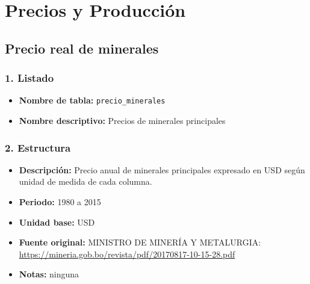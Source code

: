 \documentclass[12pt,a4paper]{article}
\begin{document}
\section{Precios y Producción}

\subsection{Precio real de minerales}

\subsubsection*{1. Listado}
\begin{itemize}
  \item \textbf{Nombre de tabla:} \texttt{precio\_minerales}
  \item \textbf{Nombre descriptivo:} Precios de minerales principales
\end{itemize}

\subsubsection*{2. Estructura}
\begin{itemize}
  \item \textbf{Descripción:} Precio anual de minerales principales expresado en USD según unidad de medida de cada columna.
  \item \textbf{Periodo:} 1980 a 2015
  \item \textbf{Unidad base:} USD
  \item \textbf{Fuente original:} MINISTRO DE MINERÍA Y METALURGIA:\\
    \url{https://mineria.gob.bo/revista/pdf/20170817-10-15-28.pdf}
  \item \textbf{Notas:} ninguna
\end{itemize}
\end{document}
